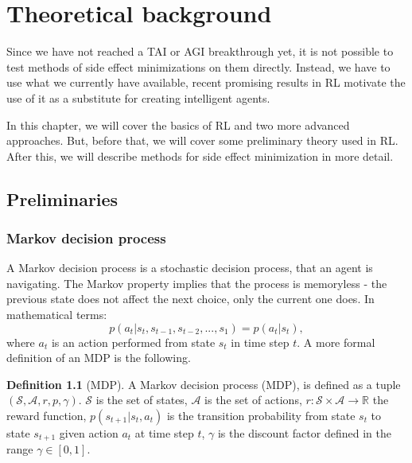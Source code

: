 \documentclass[12pt,A4]{report}
\theoremstyle{definition}
\newtheorem{definition}{Definition}[section]
\begin{document}
 


\chapter{Theoretical background}
Since we have not reached a TAI or AGI breakthrough yet, it is not possible to test methods of side effect minimizations on them directly. Instead, we have to use what we currently have available, recent promising results in RL motivate the use of it as a substitute for creating intelligent agents.

In this chapter, we will cover the basics of RL and two more advanced approaches. But, before that, we will cover some preliminary theory used in RL. After this, we will describe methods for side effect minimization in more detail.


\section{Preliminaries}

\subsection{Markov decision process}
A Markov decision process is a stochastic decision process, that an agent is navigating. The Markov property implies that the process is memoryless - the previous state does not affect the next choice, only the current one does. In mathematical terms:
\[ p(a_t|s_t, s_{t-1}, s_{t-2}, ... , s_1) = p(a_t|s_t),\]
where $a_t$ is an action performed from state $s_t$ in time step $t$. A more formal definition of an MDP is the following. 
\begin{definition}[MDP]
    A Markov decision process (MDP), is defined as a tuple $(\mathcal{S}, \mathcal{A}, r, p, \gamma)$. $\mathcal{S}$ is the set of states, $\mathcal{A}$ is the set of actions, $r: \mathcal{S} \times \mathcal{A} \rightarrow \mathbb{R}$ the reward function, $p(s_{t+1}|s_t, a_t)$ is the transition probability from state $s_t$ to state $s_{t+1}$ given action $a_t$ at time step $t$, $\gamma$ is the discount factor defined in the range $\gamma \in [0, 1]$.
\end{definition}
\end{document}
